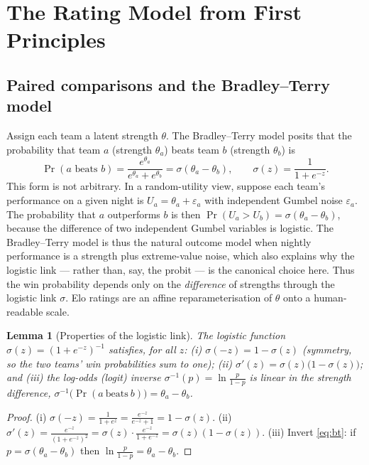 \documentclass[11pt]{article}
\newtheorem{lemma}{Lemma}
\begin{document}
\section{The Rating Model from First Principles}

\subsection{Paired comparisons and the Bradley--Terry model}
Assign each team a latent strength $\theta$. The Bradley--Terry model posits that
the probability that team $a$ (strength $\theta_a$) beats team $b$ (strength
$\theta_b$) is
\begin{equation}
\Pr(a \text{ beats } b) = \frac{e^{\theta_a}}{e^{\theta_a} + e^{\theta_b}}
= \sigma(\theta_a - \theta_b), \qquad \sigma(z) = \frac{1}{1 + e^{-z}}.
\label{eq:bt}
\end{equation}
This form is not arbitrary. In a random-utility view, suppose each team's
performance on a given night is $U_a = \theta_a + \varepsilon_a$ with independent
Gumbel noise $\varepsilon_a$. The probability that $a$ outperforms $b$ is then
$\Pr(U_a > U_b) = \sigma(\theta_a - \theta_b)$, because the difference of two
independent Gumbel variables is logistic. The Bradley--Terry model is thus the
natural outcome model when nightly performance is a strength plus extreme-value
noise, which also explains why the logistic link --- rather than, say, the probit
--- is the canonical choice here.
Thus the win probability depends only on the \emph{difference} of strengths
through the logistic link $\sigma$. Elo ratings are an affine reparameterisation
of $\theta$ onto a human-readable scale.

\begin{lemma}[Properties of the logistic link]
\label{lem:sigmoid}
The logistic function $\sigma(z) = (1+e^{-z})^{-1}$ satisfies, for all $z$:
(i) $\sigma(-z) = 1 - \sigma(z)$ (symmetry, so the two teams' win probabilities
sum to one); (ii) $\sigma'(z) = \sigma(z)\big(1 - \sigma(z)\big)$; and
(iii) the log-odds (logit) inverse $\sigma^{-1}(p) = \ln\!\frac{p}{1-p}$ is linear
in the strength difference, $\sigma^{-1}\!\big(\Pr(a\ \text{beats}\ b)\big)
= \theta_a - \theta_b$.
\end{lemma}

\begin{proof}
(i) $\sigma(-z) = \frac{1}{1+e^{z}} = \frac{e^{-z}}{e^{-z}+1} = 1-\sigma(z)$.
(ii) $\sigma'(z) = \frac{e^{-z}}{(1+e^{-z})^2}
= \sigma(z)\cdot\frac{e^{-z}}{1+e^{-z}} = \sigma(z)(1-\sigma(z))$.
(iii) Invert \eqref{eq:bt}: if $p = \sigma(\theta_a-\theta_b)$ then
$\ln\frac{p}{1-p} = \theta_a-\theta_b$.
\end{proof}
\end{document}
